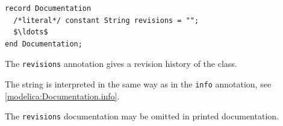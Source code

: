 \begin{annotationdefinition*}[revisions]\label{modelica:Documentation.revisions}
\begin{synopsis}\begin{lstlisting}
record Documentation
  /*literal*/ constant String revisions = "";
  $\ldots$
end Documentation;
\end{lstlisting}\end{synopsis}
\begin{semantics}
The \lstinline!revisions! annotation gives a revision history of the class.

The string is interpreted in the same way as in the \lstinline!info! annotation, see \cref{modelica:Documentation.info}.

\begin{nonnormative}
The \lstinline!revisions! documentation may be omitted in printed documentation.
\end{nonnormative}
\end{semantics}
\end{annotationdefinition*}

